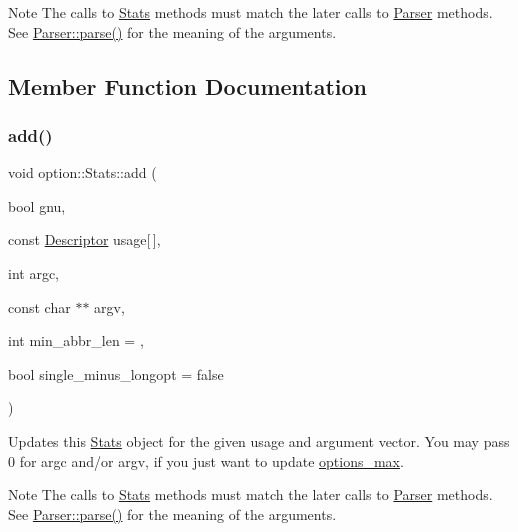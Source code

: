 \begin{DoxyNote}{Note}
The calls to \hyperlink{structoption_1_1_stats}{Stats} methods must match the later calls to \hyperlink{classoption_1_1_parser}{Parser} methods. See \hyperlink{classoption_1_1_parser_a6e0b5778d1cfbd6cd51240e74d01e138}{Parser\+::parse()} for the meaning of the arguments. 
\end{DoxyNote}


\subsection{Member Function Documentation}
\mbox{\label{structoption_1_1_stats_aa77e2a8b1704527d2d087820f4456143}} 
\subsubsection{\texorpdfstring{add()}{add()}}
{\footnotesize\ttfamily void option\+::\+Stats\+::add (\begin{DoxyParamCaption}\item[{bool}]{gnu,  }\item[{const \hyperlink{structoption_1_1_descriptor}{Descriptor}}]{usage\mbox{[}$\,$\mbox{]},  }\item[{int}]{argc,  }\item[{const char $\ast$$\ast$}]{argv,  }\item[{int}]{min\+\_\+abbr\+\_\+len = {},  }\item[{bool}]{single\+\_\+minus\+\_\+longopt = {\ttfamily false} }\end{DoxyParamCaption})\hspace{0.3cm}{\ttfamily [inline]}}



Updates this \hyperlink{structoption_1_1_stats}{Stats} object for the given {\ttfamily usage} and argument vector. You may pass 0 for {\ttfamily argc} and/or {\ttfamily argv}, if you just want to update \hyperlink{structoption_1_1_stats_a8121787feb1c7db84fca3ccb012b0473}{options\+\_\+max}. 

\begin{DoxyNote}{Note}
The calls to \hyperlink{structoption_1_1_stats}{Stats} methods must match the later calls to \hyperlink{classoption_1_1_parser}{Parser} methods. See \hyperlink{classoption_1_1_parser_a6e0b5778d1cfbd6cd51240e74d01e138}{Parser\+::parse()} for the meaning of the arguments. 
\end{DoxyNote}


